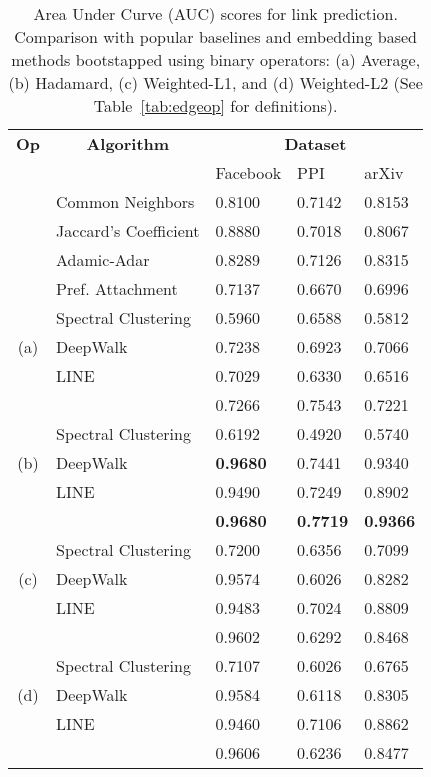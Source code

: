 \begin{table}[h]
\centering
	\begin{tabular}{c|l|l|l|l}
	\multicolumn{1}{c}{\textbf{Op}} & \multicolumn{1}{c}{\textbf{Algorithm}} & \multicolumn{3}{c}{\textbf{Dataset}}      \\ 
	         			    & & Facebook     & PPI    & arXiv      \\ \hline
	& Common Neighbors        & 0.8100 & 0.7142 & 0.8153 \\
	& Jaccard's Coefficient   & 0.8880 & 0.7018 & 0.8067 \\
	& Adamic-Adar             & 0.8289 & 0.7126 & 0.8315 \\
	& Pref. Attachment 		  & 0.7137 & 0.6670 & 0.6996 \\ \hline
	& Spectral Clustering     & 0.5960 & 0.6588 & 0.5812 \\
	(a) & DeepWalk            & 0.7238 & 0.6923 & 0.7066 \\ & LINE 			  		  & 0.7029 & 0.6330 & 0.6516 \\
	& \nodevec 		  		  & 0.7266 & 0.7543 & 0.7221 \\ \hline 
	& Spectral Clustering     & 0.6192 & 0.4920 & 0.5740 \\
	(b) & DeepWalk            & \textbf{0.9680} & 0.7441 & 0.9340 \\ & LINE 			  		  & 0.9490 & 0.7249 & 0.8902  \\
	& \nodevec 		  		  & \textbf{0.9680} & \textbf{0.7719} & \textbf{0.9366}\\ \hline 
	& Spectral Clustering     & 0.7200 & 0.6356 & 0.7099\\
	(c) & DeepWalk            & 0.9574 & 0.6026 & 0.8282 \\ & LINE 			  		  & 0.9483 & 0.7024 & 0.8809 \\
	& \nodevec 	      		  & 0.9602 & 0.6292 & 0.8468 \\ \hline 
	& Spectral Clustering     & 0.7107 & 0.6026 & 0.6765 \\
	(d) & DeepWalk            & 0.9584 & 0.6118 & 0.8305 \\ & LINE 			  		  & 0.9460 & 0.7106 & 0.8862 \\
	& \nodevec          	  & 0.9606 & 0.6236 & 0.8477  \\ 
	\end{tabular}
	\vspace{-0.2cm}
	\caption{Area Under Curve (AUC) scores for link prediction. Comparison with popular baselines and embedding based methods bootstapped using binary operators: (a) Average, (b) Hadamard, (c) Weighted-L1, and (d) Weighted-L2
	(See Table~\ref{tab:edgeop} for definitions).
	}\label{tab:lp_random}
	\vspace{-0.4cm}
\end{table}



